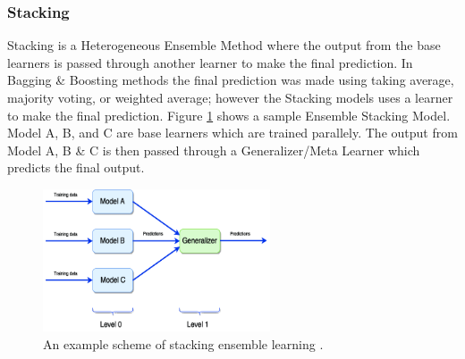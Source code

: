 \documentclass[twoside,11pt,a4paper]{article}
\begin{document}
\subsubsection{Stacking}
Stacking is a Heterogeneous Ensemble Method where the output from the base learners is passed through another learner to make the final prediction. In Bagging \& Boosting methods the final prediction was made using taking average, majority voting, or weighted average; however the Stacking models uses a learner to make the final prediction. Figure \ref{fig:stacking} shows a sample Ensemble Stacking Model. Model A, B, and C are base learners which are trained parallely. The output from Model A, B \& C is then passed through a Generalizer/Meta Learner which predicts the final output. \\
\begin{figure}[ht]
	\centering
	\includegraphics[width=0.6\textwidth]{stacking}
	\caption[An example scheme of stacking ensemble learning. ]{An example scheme of stacking ensemble learning \cite{divina2018stacking}.}
	\label{fig:stacking}
\end{figure}
\FloatBarrier
\end{document}
